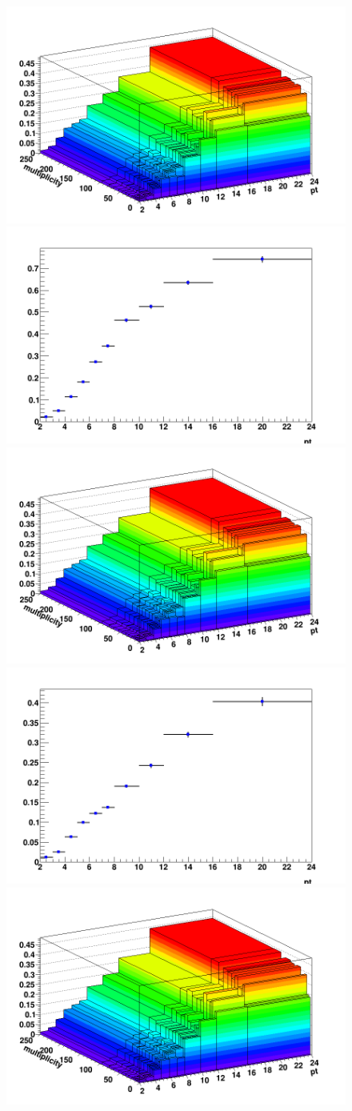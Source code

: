 \begin{figure}[h]   %
	\centering
\includegraphics[width=.48\linewidth]{figuresVsCent/Dzero/EffAndFeed/EfficiencyMap_2D_Dzero_c_RefPtBins_Cuts020_MultWeig_wLimAcc_Plot.png}
	\includegraphics[width=.48\linewidth]{figuresVsCent/Dstar/EffAndFeed/EfficiencyMap_1D_DStar_c_020_ZNA_wLimAcc_Plot.png}
\includegraphics[width=.48\linewidth]{figuresVsCent/Dzero/EffAndFeed/EfficiencyMap_2D_Dzero_c_RefPtBins_Cuts020_MultWeig_wLimAcc_Plot.png}
\includegraphics[width=.48\linewidth]{figuresVsCent/Dzero/EffAndFeed/EfficiencyMap_1D_Dzero_c_RefPtBins_Cuts020_MultWeig_wLimAcc_Plot.png}
\includegraphics[width=.48\linewidth]{figuresVsCent/Dzero/EffAndFeed/EfficiencyMap_2D_Dzero_c_RefPtBins_Cuts020_MultWeig_wLimAcc_Plot.png}

\end{figure}
